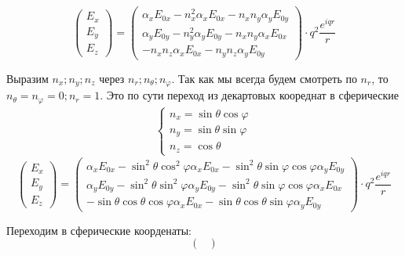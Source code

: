 \documentclass[12pt]{article}
\begin{document}
\begin{large}
\begin{equation*}
    \begin{pmatrix}
        E_x \\
        E_y \\
        E_z
    \end{pmatrix}
    =
    \begin{pmatrix}
        \alpha_x E_{0x} - n_x^2 \alpha_x E_{0x} - n_x n_y \alpha_y E_{0y} \\
        \alpha_y E_{0y} - n_y^2 \alpha_y E_{0y} - n_x n_y \alpha_x E_{0x} \\
        - n_x n_z \alpha_x E_{0x} - n_y n_z \alpha_y E_{0y}
    \end{pmatrix}
    \cdot q^2 \frac{e^{iqr}}{r}
\end{equation*}
\par Выразим $n_x; n_y; n_z$ через $n_r; n_\theta; n_\varphi$. Так как мы всегда будем смотреть по $n_r$, то $n_\theta = n_\varphi = 0; n_r = 1$. Это по сути переход из декартовых коореднат в сферические
\begin{eqnarray*}
    \begin{cases}
        n_x = \sin \theta \cos \varphi \\
        n_y = \sin \theta \sin \varphi \\
        n_z = \cos \theta
    \end{cases}
\end{eqnarray*}
\begin{equation*}
    \begin{pmatrix}
        E_x \\
        E_y \\
        E_z
    \end{pmatrix}
    =
    \begin{pmatrix}
        \alpha_x E_{0x} - \sin^2 \theta \cos^2 \varphi \alpha_x E_{0x} - \sin^2 \theta \sin \varphi \cos \varphi \alpha_y E_{0y} \\
        \alpha_y E_{0y} - \sin^2 \theta \sin^2 \varphi \alpha_y E_{0y} - \sin^2 \theta \sin \varphi \cos \varphi \alpha_x E_{0x} \\
        - \sin \theta \cos \theta \cos \varphi \alpha_x E_{0x} - \sin \theta \cos \theta \sin \varphi \alpha_y E_{0y}
    \end{pmatrix}
    \cdot q^2 \frac{e^{iqr}}{r}
\end{equation*}
\par Переходим в сферические коорденаты:
\begin{equation*}
    \begin{pmatrix}

\end{pmatrix}
\end{equation*}
\end{large}
\end{document}
